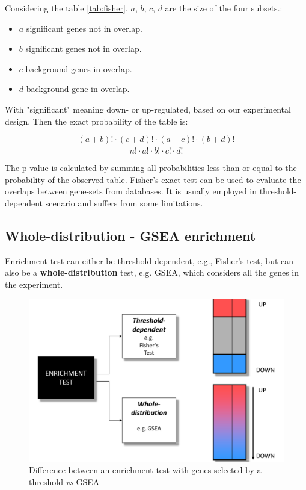 		Considering the table \ref{tab:fisher}, $a$, $b$, $c$, $d$ are the size of the four subsets.:

			\begin{itemize}
				\item $a$ significant genes not in overlap.
				\item $b$ significant genes not in overlap.
				\item $c$ background genes in overlap.
				\item $d$ background gene in overlap.
			\end{itemize}
		
		With "significant" meaning down- or up-regulated, based on our experimental design.
		Then the exact probability of the table is:

		$$\frac{(a+b)!\cdot(c+d)!\cdot(a+c)!\cdot(b+d)!}{n!\cdot a!\cdot b!\cdot c!\cdot d!}$$

		The p-value is calculated by summing all probabilities less than or equal to the probability of the observed table.
		Fisher's exact test can be used to evaluate the overlaps between gene-sets from databases.
		It is usually employed in threshold-dependent scenario and suffers from some limitations.

	\subsection{Whole-distribution - GSEA enrichment}
	Enrichment test can either be threshold-dependent, e.g., Fisher's test, but can also  be a \textbf{whole-distribution} test, e.g. GSEA, which considers all the genes in the experiment.
	
	\begin{figure}[H]
	\centering
	\includegraphics[scale=0.2]{beyond}
	\caption{Difference between an enrichment test with genes selected by a threshold \textit{vs} GSEA }
	\label{fig:beyond}
	\end{figure}
	
